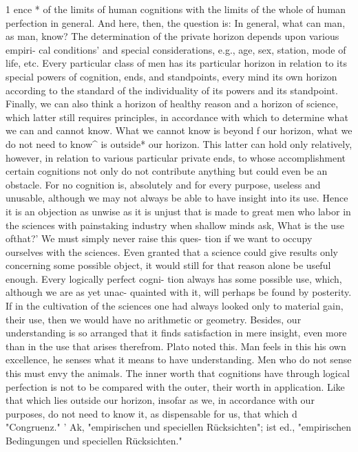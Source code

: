 1
ence * of the limits of human cognitions with the limits of the whole of
human perfection in general. And here, then, the question is: In general,
what can man, as man, know?
The determination of the private horizon depends upon various empiri-
cal conditions' and special considerations, e.g., age, sex, station, mode of
life, etc. Every particular class of men has its particular horizon in relation
to its special powers of cognition, ends, and standpoints, every mind its
own horizon according to the standard of the individuality of its powers
and its standpoint. Finally, we can also think a horizon of healthy reason
and a horizon of science, which latter still requires principles, in accordance
with which to determine what we can and cannot know.
What we cannot know is beyond f our horizon, what we do not need to
know^ is outside* our horizon. This latter can hold only relatively, however,
in relation to various particular private ends, to whose accomplishment
certain cognitions not only do not contribute anything but could even be
an obstacle. For no cognition is, absolutely and for every purpose, useless
and unusable, although we may not always be able to have insight into its
use. Hence it is an objection as unwise as it is unjust that is made to great
men who labor in the sciences with painstaking industry when shallow
minds ask, What is the use ofthat?' We must simply never raise this ques-
tion if we want to occupy ourselves with the sciences. Even granted that a
science could give results only concerning some possible object, it would
still for that reason alone be useful enough. Every logically perfect cogni-
tion always has some possible use, which, although we are as yet unac-
quainted with it, will perhaps be found by posterity. If in the cultivation of
the sciences one had always looked only to material gain, their use, then
we would have no arithmetic or geometry. Besides, our understanding is
so arranged that it finds satisfaction in mere insight, even more than in the
use that arises therefrom. Plato noted this. Man feels in this his own
excellence, he senses what it means to have understanding. Men who do
not sense this must envy the animals. The inner worth that cognitions have
through logical perfection is not to be compared with the outer, their worth
in application.
Like that which lies outside our horizon, insofar as we, in accordance
with our purposes, do not need to know it, as dispensable for us, that which
d
"Congruenz."
' Ak, "empirischen und speciellen Rücksichten"; ist ed., "empirischen Bedingungen und
speciellen Rücksichten."
